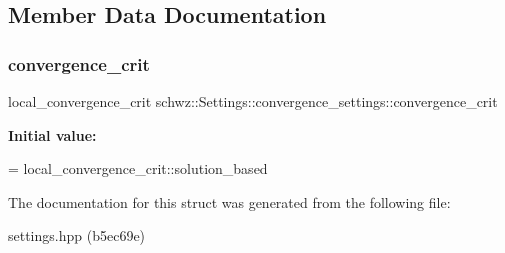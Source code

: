 \subsection{Member Data Documentation}
\mbox{\label{structschwz_1_1Settings_1_1convergence__settings_a509f2b6af29a7afeafda9d45f8e12623}} 
\subsubsection{\texorpdfstring{convergence\+\_\+crit}{convergence\_crit}}
{\footnotesize\ttfamily local\+\_\+convergence\+\_\+crit schwz\+::\+Settings\+::convergence\+\_\+settings\+::convergence\+\_\+crit}

{\bfseries Initial value\+:}
\begin{DoxyCode}
=
            local\_convergence\_crit::solution\_based
\end{DoxyCode}


The documentation for this struct was generated from the following file\+:\begin{DoxyCompactItemize}
\item 
settings.\+hpp (b5ec69e)\end{DoxyCompactItemize}
